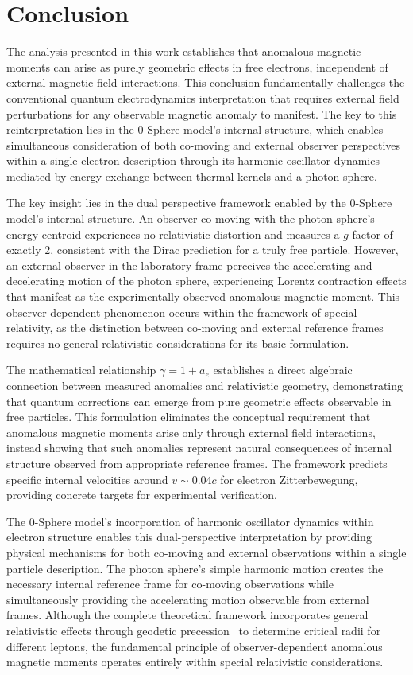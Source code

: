 \documentclass[%
 reprint,
 amsmath,amssymb,
 aps,
]{revtex4-1}
\numberwithin{equation}{section}%
\begin{document}
\section{Conclusion}

The analysis presented in this work establishes that anomalous magnetic moments can arise as purely geometric effects in free electrons, independent of external magnetic field interactions. This conclusion fundamentally challenges the conventional quantum electrodynamics interpretation that requires external field perturbations for any observable magnetic anomaly to manifest. The key to this reinterpretation lies in the 0-Sphere model's internal structure, which enables simultaneous consideration of both co-moving and external observer perspectives within a single electron description through its harmonic oscillator dynamics mediated by energy exchange between thermal kernels and a photon sphere.

The key insight lies in the dual perspective framework enabled by the 0-Sphere model's internal structure. An observer co-moving with the photon sphere's energy centroid experiences no relativistic distortion and measures a $g$-factor of exactly 2, consistent with the Dirac prediction for a truly free particle. However, an external observer in the laboratory frame perceives the accelerating and decelerating motion of the photon sphere, experiencing Lorentz contraction effects that manifest as the experimentally observed anomalous magnetic moment. This observer-dependent phenomenon occurs within the framework of special relativity, as the distinction between co-moving and external reference frames requires no general relativistic considerations for its basic formulation.

The mathematical relationship $\gamma = 1 + a_e$ establishes a direct algebraic connection between measured anomalies and relativistic geometry, demonstrating that quantum corrections can emerge from pure geometric effects observable in free particles. This formulation eliminates the conceptual requirement that anomalous magnetic moments arise only through external field interactions, instead showing that such anomalies represent natural consequences of internal structure observed from appropriate reference frames. The framework predicts specific internal velocities around $v \sim 0.04c$ for electron Zitterbewegung, providing concrete targets for experimental verification.

The 0-Sphere model's incorporation of harmonic oscillator dynamics within electron structure enables this dual-perspective interpretation by providing physical mechanisms for both co-moving and external observations within a single particle description. The photon sphere's simple harmonic motion creates the necessary internal reference frame for co-moving observations while simultaneously providing the accelerating motion observable from external frames. Although the complete theoretical framework incorporates general relativistic effects through geodetic precession~\cite{thomas1926,thomas1927} to determine critical radii for different leptons, the fundamental principle of observer-dependent anomalous magnetic moments operates entirely within special relativistic considerations.
\end{document}
